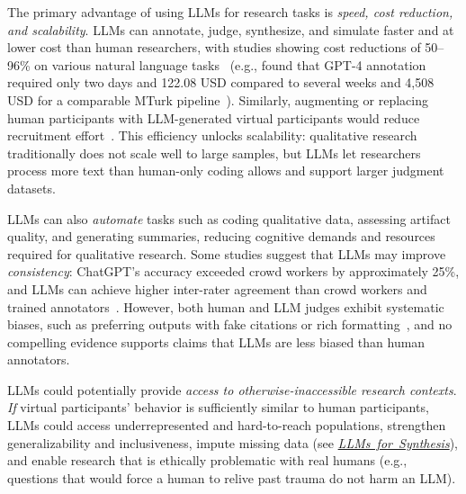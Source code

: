 \documentclass[smallextended]{svjour3}
\newcommand{\synthesis}{\hyperref[sec:llms-for-synthesis]{\mbox{\emph{LLMs for Synthesis}}}\xspace}
\newcommand{\synthesis}{\href{/study-types/synthesis/}{\emph{LLMs for Synthesis}}\xspace}
\begin{document}
The primary advantage of using LLMs for research tasks is \emph{speed, cost reduction, and scalability}. LLMs can annotate, judge, synthesize, and simulate faster and at lower cost than human researchers, with studies showing cost reductions of 50--96\% on various natural language tasks~\cite{DBLP:conf/emnlp/WangLXZZ21} (e.g., \citeauthor{DBLP:conf/chi/HeHDRH24} found that GPT-4 annotation required only two days and 122.08 USD compared to several weeks and 4,508 USD for a comparable MTurk pipeline~\cite{DBLP:conf/chi/HeHDRH24}). Similarly, augmenting or replacing human participants with LLM-generated virtual participants would reduce recruitment effort~\cite{DBLP:conf/vl/Madampe0HO24}. This efficiency unlocks scalability: qualitative research traditionally does not scale well to large samples, but LLMs let researchers process more text than human-only coding allows and support larger judgment datasets.

LLMs can also \emph{automate} tasks such as coding qualitative data, assessing artifact quality, and generating summaries, reducing cognitive demands and resources required for qualitative research. Some studies suggest that LLMs may improve \emph{consistency}: ChatGPT's accuracy exceeded crowd workers by approximately 25\%, and LLMs can achieve higher inter-rater agreement than crowd workers and trained annotators~\cite{DBLP:journals/corr/abs-2303-15056}. However, both human and LLM judges exhibit systematic biases, such as preferring outputs with fake citations or rich formatting~\cite{DBLP:conf/emnlp/ChenCLJW24}, and no compelling evidence supports claims that LLMs are less biased than human annotators.

LLMs could potentially provide \emph{access to otherwise-inaccessible research contexts}. \textit{If} virtual participants' behavior is sufficiently similar to human participants, LLMs could access underrepresented and hard-to-reach populations, strengthen generalizability and inclusiveness, impute missing data (see \synthesis), and enable research that is ethically problematic with real humans (e.g., questions that would force a human to relive past trauma do not harm an LLM).
\end{document}
